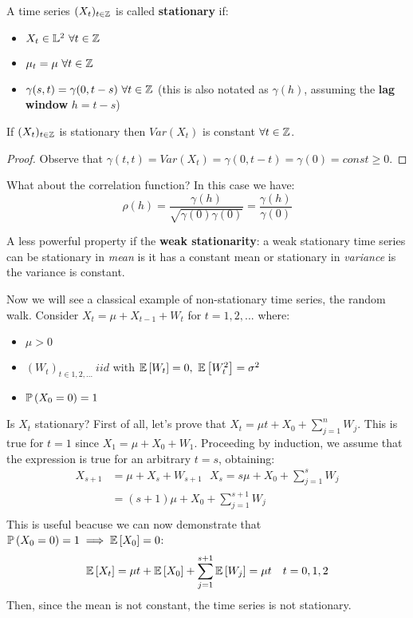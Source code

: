 \begin{definition}
    A time series $(X_t)_{t\in\mathbb{Z}}$ is called \textbf{stationary} if:
    \begin{itemize}
        \item $X_t\in\mathbb{L}^2\ \forall t\in\mathbb{Z}$
        \item $\mu_t=\mu\ \forall t\in\mathbb{Z}$
        \item $\gamma(s,t)=\gamma(0,t-s)\ \forall t\in\mathbb{Z}$ (this is also notated as $\gamma(h)$, assuming the \textbf{lag window} $h=t-s$)
    \end{itemize}
\end{definition}
\begin{corollary}
    If $(X_t)_{t\in\mathbb{Z}}$ is stationary then $Var(X_t)$ is constant $\forall t\in\mathbb{Z}$.
\end{corollary}
\begin{proof}
    Observe that $\gamma(t,t)=Var(X_t)=\gamma(0,t-t)=\gamma(0)= const \ge 0$.
\end{proof}
What about the correlation function? In this case we have:
\[
    \rho(h)=\frac{\gamma(h)}{\sqrt{\gamma(0)\gamma(0)}}=\frac{\gamma(h)}{\gamma(0)} 
\]

A less powerful property if the \textbf{weak stationarity}: a weak stationary time series can be stationary in \textit{mean} is it has a constant mean or stationary in \textit{variance} is the variance is constant.

\begin{example}
    Now we will see a classical example of non-stationary time series, the random walk. Consider $X_t=\mu+X_{t-1}+W_t$ for $t=1,2,...$ where:
    \begin{itemize}
        \item $\mu>0$
        \item $(W_t)_{t\in{1,2,...}}\ iid$ with $\expect{W_t}=0,\ \expect{W_t^2}=\sigma^2$
        \item $\mathbb{P}\left(X_0=0\right)=1$
    \end{itemize}
    Is $X_t$ stationary?
    First of all, let's prove that $X_t=\mu t+X_0+\sum_{j=1}^n W_j$. This is true for $t=1$ since $X_1=\mu+X_0+W_1$. Proceeding by induction, we assume that the expression is true for an arbitrary $t=s$, obtaining:
    \begin{equation*}
        \begin{split}
            X_{s+1}&=\mu+X_s+W_{s+1}\ \ \ X_s=s\mu+X_0+\sum_{j=1}^sW_j\\
            &=(s+1)\mu+X_0+\sum_{j=1}^{s+1}W_j\\
        \end{split}
    \end{equation*}
    This is useful beacuse we can now demonstrate that $\mathbb{P}\left(X_0=0\right)=1 \implies \mathbb{E}\left[X_0\right]=0$:
    \begin{equation*}
        \begin{split}
            \mathbb{E}\left[X_t\right]=\mu t+\mathbb{E}\left[X_0\right]+\sum_{j=1}^{s+1}\mathbb{E}\left[W_j\right]=\mu t\ \ \ t=0,1,2
        \end{split}
    \end{equation*}
    Then, since the mean is not constant, the time series is not stationary.
\end{example}

